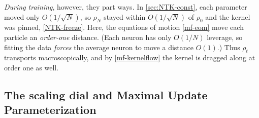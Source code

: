 \documentclass[11pt]{article}
\begin{document}
\emph{During training}, however, they part ways. In \cref{sec:NTK-const}, each parameter moved only $O(1/\sqrt N)$, so $\rho_N$ stayed within $O(1/\sqrt N)$ of $\rho_0$ and the kernel was pinned, \eqref{NTK-freeze}. Here, the equations of motion \eqref{mf-eom} move each particle an \emph{order-one} distance. (Each neuron has only $O(1/N)$ leverage, so fitting the data \emph{forces} the average neuron to move a distance $O(1)$.) Thus $\rho_t$ transports macroscopically, and by \eqref{mf-kernelflow} the kernel is dragged along at order one as well. 


%

\subsection{The scaling dial and Maximal Update Parameterization}
\label{sec:MFT-dial}
\end{document}
